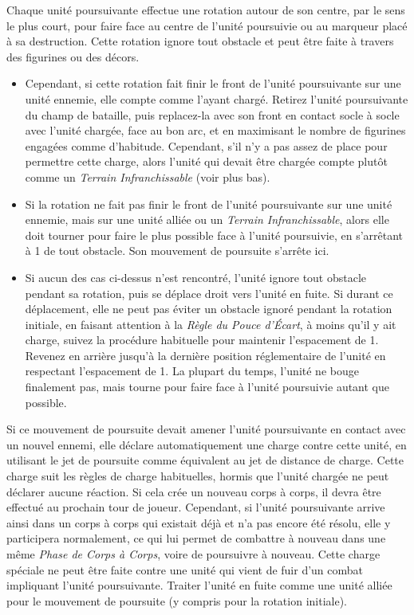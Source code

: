 Chaque unité poursuivante effectue une rotation autour de son centre, par le sens le plus court, pour faire face au centre de l'unité poursuivie ou au marqueur placé à sa destruction. Cette rotation ignore tout obstacle et peut être faite à travers des figurines ou des décors.
\begin{itemize}[label={-}]
\item Cependant, si cette rotation fait finir le front de l'unité poursuivante sur une unité ennemie, elle compte comme l'ayant chargé. Retirez l'unité poursuivante du champ de bataille, puis replacez-la avec son front en contact socle à socle avec l'unité chargée, face au bon arc, et en maximisant le nombre de figurines engagées comme d'habitude. Cependant, s'il n'y a pas assez de place pour permettre cette charge, alors l'unité qui devait être chargée compte plutôt comme un \emph{Terrain Infranchissable} (voir plus bas).
\item Si la rotation ne fait pas finir le front de l'unité poursuivante sur une unité ennemie, mais sur une unité alliée ou un \emph{Terrain Infranchissable}, alors elle doit tourner pour faire le plus possible face à l'unité poursuivie, en s'arrêtant à \unit{1}{\pouce} de tout obstacle. Son mouvement de poursuite s'arrête ici.
\item Si aucun des cas ci-dessus n'est rencontré, l'unité ignore tout obstacle pendant sa rotation, puis se déplace droit vers l'unité en fuite. Si durant ce déplacement, elle ne peut pas éviter un obstacle ignoré pendant la rotation initiale, en faisant attention à la \emph{Règle du Pouce d'Écart}, à moins qu'il y ait charge, suivez la procédure habituelle pour maintenir l'espacement de \unit{1}{\pouce}. Revenez en arrière jusqu'à la dernière position réglementaire de l'unité en respectant l'espacement de \unit{1}{\pouce}. La plupart du temps, l'unité ne bouge finalement pas, mais tourne pour faire face à l'unité poursuivie autant que possible.
\end{itemize}

Si ce mouvement de poursuite devait amener l'unité poursuivante en contact avec un nouvel ennemi, elle déclare automatiquement une charge contre cette unité, en utilisant le jet de poursuite comme équivalent au jet de distance de charge. Cette charge suit les règles de charge habituelles, hormis que l'unité chargée ne peut déclarer aucune réaction. Si cela crée un nouveau corps à corps, il devra être effectué au prochain tour de joueur. Cependant, si l'unité poursuivante arrive ainsi dans un corps à corps qui existait déjà et n'a pas encore été résolu, elle y participera normalement, ce qui lui permet de combattre à nouveau dans une même \emph{Phase de Corps à Corps}, voire de poursuivre à nouveau. Cette charge spéciale ne peut être faite contre une unité qui vient de fuir d'un combat impliquant l'unité poursuivante. Traiter l'unité en fuite comme une unité alliée pour le mouvement de poursuite (y compris pour la rotation initiale).

